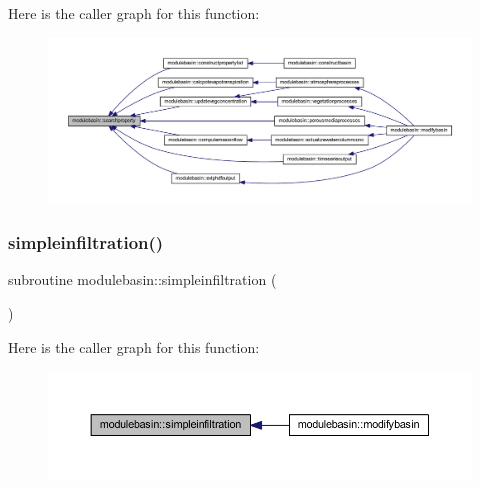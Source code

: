 Here is the caller graph for this function\+:\nopagebreak
\begin{figure}[H]
\begin{center}
\leavevmode
\includegraphics[width=350pt]{namespacemodulebasin_aa2e4e95b7bf5ee3e53a64d7f2269c946_icgraph}
\end{center}
\end{figure}
\mbox{\label{namespacemodulebasin_a7c47f016b2561d84dff67a1089c6c8f0}} 
\subsubsection{\texorpdfstring{simpleinfiltration()}{simpleinfiltration()}}
{\footnotesize\ttfamily subroutine modulebasin\+::simpleinfiltration (\begin{DoxyParamCaption}{ }\end{DoxyParamCaption})\hspace{0.3cm}{\ttfamily [private]}}

Here is the caller graph for this function\+:\nopagebreak
\begin{figure}[H]
\begin{center}
\leavevmode
\includegraphics[width=350pt]{namespacemodulebasin_a7c47f016b2561d84dff67a1089c6c8f0_icgraph}
\end{center}
\end{figure}
\mbox{\label{namespacemodulebasin_a19824f46960f411ab472a65b6e3a9d2e}} 
